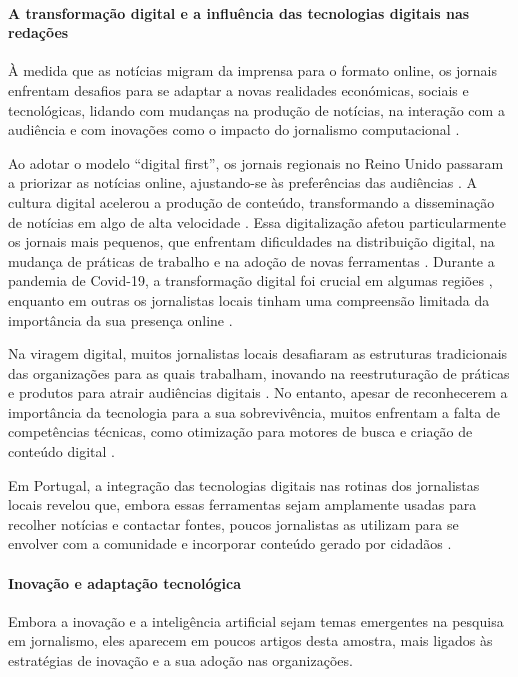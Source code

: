 \documentclass[portuguese]{textolivre}
\begin{document}
\paragraph{A transformação digital e a influência das tecnologias digitais nas redações}

À medida que as notícias migram da imprensa para o formato online, os jornais enfrentam desafios para se adaptar a novas realidades económicas, sociais e tecnológicas, lidando com mudanças na produção de notícias, na interação com a audiência \cite{anderson2013} e com inovações como o impacto do jornalismo computacional \cite{young2015}.

Ao adotar o modelo “digital first”, os jornais regionais no Reino Unido passaram a priorizar as notícias online, ajustando-se às preferências das audiências \cite{clark2023}. A cultura digital acelerou a produção de conteúdo, transformando a disseminação de notícias em algo de alta velocidade \cite{hagen2022, hradziushka2020}. Essa digitalização afetou particularmente os jornais mais pequenos, que enfrentam dificuldades na distribuição digital, na mudança de práticas de trabalho e na adoção de novas ferramentas \cite{ali2019}. Durante a pandemia de Covid-19, a transformação digital foi crucial em algumas regiões \cite{gurkan2023}, enquanto em outras os jornalistas locais tinham uma compreensão limitada da importância da sua presença online \cite{ivask2024}.

Na viragem digital, muitos jornalistas locais desafiaram as estruturas tradicionais das organizações para as quais trabalham, inovando na reestruturação de práticas e produtos para atrair audiências digitais \cite{jenkins2021}. No entanto, apesar de reconhecerem a importância da tecnologia para a sua sobrevivência, muitos enfrentam a falta de competências técnicas, como otimização para motores de busca e criação de conteúdo digital \cite{esa2022}.

Em Portugal, a integração das tecnologias digitais nas rotinas dos jornalistas locais revelou que, embora essas ferramentas sejam amplamente usadas para recolher notícias e contactar fontes, poucos jornalistas as utilizam para se envolver com a comunidade e incorporar conteúdo gerado por cidadãos \cite{jeronimo2022}.


\paragraph{Inovação e adaptação tecnológica}

Embora a inovação e a inteligência artificial sejam temas emergentes na pesquisa em jornalismo, eles aparecem em poucos artigos desta amostra, mais ligados às estratégias de inovação e a sua adoção nas organizações.
\end{document}
